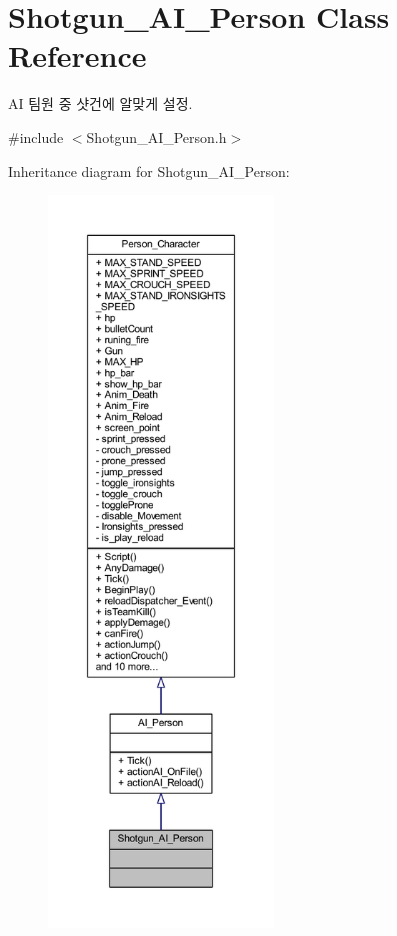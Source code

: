 \hypertarget{class_shotgun___a_i___person}{}\section{Shotgun\+\_\+\+A\+I\+\_\+\+Person Class Reference}
\label{class_shotgun___a_i___person}


AI 팀원 중 샷건에 알맞게 설정.  




{\ttfamily \#include $<$Shotgun\+\_\+\+A\+I\+\_\+\+Person.\+h$>$}



Inheritance diagram for Shotgun\+\_\+\+A\+I\+\_\+\+Person\+:
\nopagebreak
\begin{figure}[H]
\begin{center}
\leavevmode
\includegraphics[height=550pt]{class_shotgun___a_i___person__inherit__graph}
\end{center}
\end{figure}


